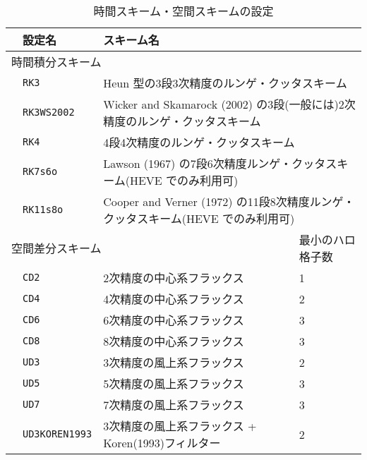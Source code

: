 \begin{table}[h]
\begin{center}
  \caption{時間スキーム・空間スキームの設定}
  \label{tab:nml_atm_dyn}
  \begin{tabularx}{150mm}{llXX} \hline
    \rowcolor[gray]{0.9} & \multicolumn{1}{l}{設定名} & \multicolumn{1}{l}{スキーム名} & \\ \hline
    \multicolumn{3}{l}{時間積分スキーム} &  \\ \hline
    & \multicolumn{1}{l}{\verb|RK3|}       & \multicolumn{2}{l}{Heun 型の3段3次精度のルンゲ・クッタスキーム} \\
    & \multicolumn{1}{l}{\verb|RK3WS2002|} & \multicolumn{2}{l}{Wicker and Skamarock (2002) の3段(一般には)2次精度のルンゲ・クッタスキーム} \\
    & \multicolumn{1}{l}{\verb|RK4|}       & \multicolumn{2}{l}{4段4次精度のルンゲ・クッタスキーム} \\
    & \multicolumn{1}{l}{\verb|RK7s6o|}    & \multicolumn{2}{l}{Lawson (1967) の7段6次精度ルンゲ・クッタスキーム(HEVE でのみ利用可)} \\
    & \multicolumn{1}{l}{\verb|RK11s8o|}   & \multicolumn{2}{l}{Cooper and Verner (1972) の11段8次精度ルンゲ・クッタスキーム(HEVE でのみ利用可)} \\
    \hline
    \multicolumn{3}{l}{空間差分スキーム} & 最小のハロ格子数\\ \hline
    & \multicolumn{1}{l}{\verb|CD2|} & \multicolumn{1}{l}{2次精度の中心系フラックス} & \multicolumn{1}{l}{1}\\
    & \multicolumn{1}{l}{\verb|CD4|} & \multicolumn{1}{l}{4次精度の中心系フラックス} & \multicolumn{1}{l}{2}\\
    & \multicolumn{1}{l}{\verb|CD6|} & \multicolumn{1}{l}{6次精度の中心系フラックス} & \multicolumn{1}{l}{3}\\
    & \multicolumn{1}{l}{\verb|CD8|} & \multicolumn{1}{l}{8次精度の中心系フラックス} & \multicolumn{1}{l}{3}\\
    & \multicolumn{1}{l}{\verb|UD3|} & \multicolumn{1}{l}{3次精度の風上系フラックス} & \multicolumn{1}{l}{2}\\
    & \multicolumn{1}{l}{\verb|UD5|} & \multicolumn{1}{l}{5次精度の風上系フラックス} & \multicolumn{1}{l}{3}\\
    & \multicolumn{1}{l}{\verb|UD7|} & \multicolumn{1}{l}{7次精度の風上系フラックス} & \multicolumn{1}{l}{3}\\
    & \multicolumn{1}{l}{\verb|UD3KOREN1993|} & \multicolumn{1}{X}{3次精度の風上系フラックス + Koren(1993)フィルター} & \multicolumn{1}{l}{2}\\
\hline
  \end{tabularx}
\end{center}
\end{table}

